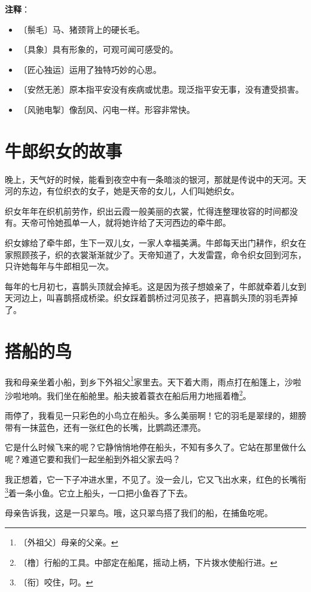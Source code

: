 \documentclass[12pt,UTF-8,openany]{ctexbook}
\begin{document}
\newpage

\textbf{注释}：

\vspace{-1em}

\begin{itemize}
    \setlength\itemsep{-0.2em}
    \item 〔鬃毛〕马、猪颈背上的硬长毛。
    \item 〔具象〕具有形象的，可观可闻可感受的。
    \item 〔匠心独运〕运用了独特巧妙的心思。
    \item 〔安然无恙〕原本指平安没有疾病或忧患。现泛指平安无事，没有遭受损害。
    \item 〔风驰电掣〕像刮风、闪电一样。形容非常快。
\end{itemize}

\chapter{牛郎织女的故事}

\begin{Large}
    
    晚上，天气好的时候，能看到夜空中有一条暗淡的银河，那就是传说中的天河。天河的东边，有位织衣的女子，她是天帝的女儿，人们叫她织女。
    
    织女年年在织机前劳作，织出云霞一般美丽的衣裳，忙得连整理妆容的时间都没有。天帝可怜她孤单一人，就将她许给了天河西边的牵牛郎。
    
    织女嫁给了牵牛郎，生下一双儿女，一家人幸福美满。牛郎每天出门耕作，织女在家照顾孩子，织的衣裳渐渐就少了。天帝知道了，大发雷霆，命令织女回到河东，只许她每年与牛郎相见一次。
    
    每年的七月初七，喜鹊头顶就会掉毛。这是因为孩子想娘亲了，牛郎就牵着儿女到天河边上，叫喜鹊搭成桥梁。织女踩着鹊桥过河见孩子，把喜鹊头顶的羽毛弄掉了。
    
\end{Large}

\chapter{搭船的鸟}

\begin{Large}
    
    我和母亲坐着小船，到乡下外祖父\footnote{〔外祖父〕母亲的父亲。}家里去。天下着大雨，雨点打在船篷上，沙啦沙啦地响。我们坐在船舱里。船夫披着蓑衣在船后用力地摇着橹\footnote{〔橹〕行船的工具。中部定在船尾，摇动上柄，下片拨水使船行进。}。
    
    雨停了，我看见一只彩色的小鸟立在船头。多么美丽啊！它的羽毛是翠绿的，翅膀带有一抹蓝色，还有一张红色的长嘴，比鹦鹉还漂亮。
    
    它是什么时候飞来的呢？它静悄悄地停在船头，不知有多久了。它站在那里做什么呢？难道它要和我们一起坐船到外祖父家去吗？
    
    我正想着，它一下子冲进水里，不见了。没一会儿，它又飞出水来，红色的长嘴衔\footnote{〔衔〕咬住，叼。}着一条小鱼。它立上船头，一口把小鱼吞了下去。
    
    母亲告诉我，这是一只翠鸟。哦，这只翠鸟搭了我们的船，在捕鱼吃呢。
    
\end{Large}
\end{document}
